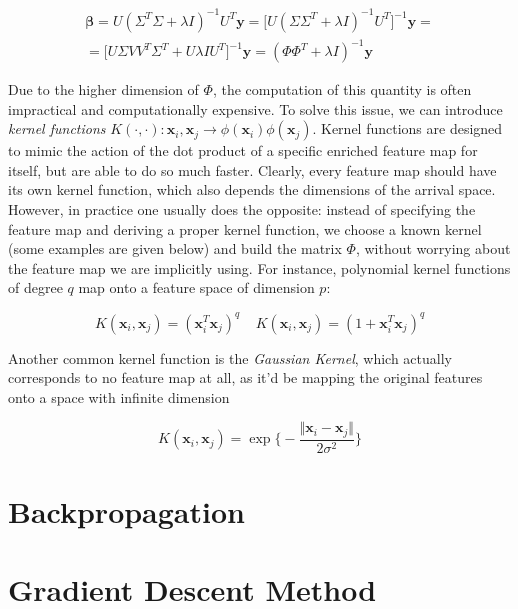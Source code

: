 \documentclass{article}
\numberwithin{equation}{subsection}
\begin{document}
\begin{gather*}
    \boldsymbol{\beta} = U(\Sigma^T \Sigma + \lambda I)^{-1} U^T \textbf{y} = \big[ U (\Sigma \Sigma^T + \lambda I)^{-1} U^T\big]^{-1} \textbf{y} = \\
    = \big[ U \Sigma V V^T \Sigma^T + U \lambda I U^T\big]^{-1} \textbf{y} = (\Phi \Phi^T + \lambda I)^{-1} \textbf{y}
\end{gather*}

Due to the higher dimension of $\Phi$, the computation of this quantity is often impractical and computationally expensive. To solve this issue, we can introduce \textit{kernel functions} $K(\cdot,\cdot) : \textbf{x}_i,\textbf{x}_j \to \phi(\textbf{x}_i)\phi(\textbf{x}_j)$. Kernel functions are designed to mimic the action of the dot product of a specific enriched feature map for itself, but are able to do so much faster. Clearly, every feature map should have its own kernel function, which also depends the dimensions of the arrival space. However, in practice one usually does the opposite: instead of specifying the feature map and deriving a proper kernel function, we choose a known kernel (some examples are given below) and build the matrix $\Phi$, without worrying about the feature map we are implicitly using. For instance, polynomial kernel functions of degree $q$ map onto a feature space of dimension $p$:

\begin{equation*}
    K(\textbf{x}_i,\textbf{x}_j) = (\textbf{x}_i^T \textbf{x}_j)^q \;\;\;\; K(\textbf{x}_i,\textbf{x}_j) = (1+\textbf{x}_i^T \textbf{x}_j)^q
\end{equation*}

Another common kernel function is the \textit{Gaussian Kernel}, which actually corresponds to no feature map at all, as it'd be mapping the original features onto a space with infinite dimension

\begin{equation*}
    K(\textbf{x}_i, \textbf{x}_j) = \exp\Bigg\{ - \frac{\Vert \textbf{x}_i - \textbf{x}_j \Vert}{2 \sigma^2} \Bigg\}
\end{equation*}

\section{Backpropagation}

\section{Gradient Descent Method}
\end{document}
